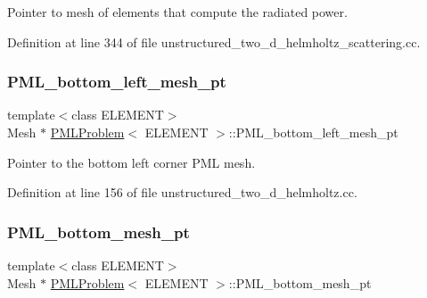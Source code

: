 Pointer to mesh of elements that compute the radiated power. 



Definition at line 344 of file unstructured\+\_\+two\+\_\+d\+\_\+helmholtz\+\_\+scattering.\+cc.

\mbox{\label{classPMLProblem_a0d32b04ee51f2a9e5e14183b212e7815}} 
\subsubsection{\texorpdfstring{P\+M\+L\+\_\+bottom\+\_\+left\+\_\+mesh\+\_\+pt}{PML\_bottom\_left\_mesh\_pt}}
{\footnotesize\ttfamily template$<$class E\+L\+E\+M\+E\+NT$>$ \\
Mesh $\ast$ \hyperlink{classPMLProblem}{P\+M\+L\+Problem}$<$ E\+L\+E\+M\+E\+NT $>$\+::P\+M\+L\+\_\+bottom\+\_\+left\+\_\+mesh\+\_\+pt\hspace{0.3cm}{\ttfamily [private]}}



Pointer to the bottom left corner P\+ML mesh. 



Definition at line 156 of file unstructured\+\_\+two\+\_\+d\+\_\+helmholtz.\+cc.

\mbox{\label{classPMLProblem_a524a93acb25ace1f12bd1bb4a23d91e3}} 
\subsubsection{\texorpdfstring{P\+M\+L\+\_\+bottom\+\_\+mesh\+\_\+pt}{PML\_bottom\_mesh\_pt}}
{\footnotesize\ttfamily template$<$class E\+L\+E\+M\+E\+NT$>$ \\
Mesh $\ast$ \hyperlink{classPMLProblem}{P\+M\+L\+Problem}$<$ E\+L\+E\+M\+E\+NT $>$\+::P\+M\+L\+\_\+bottom\+\_\+mesh\+\_\+pt\hspace{0.3cm}{\ttfamily [private]}}



